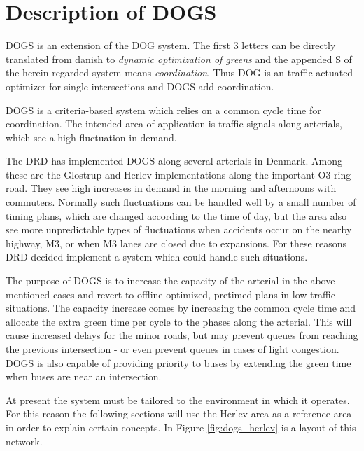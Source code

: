 \section{Description of DOGS}
\label{dogs}
DOGS is an extension of the DOG system. The first 3 letters can be directly translated from danish to \textit{dynamic optimization of greens} and the appended S of the herein regarded system means \textit{coordination}. Thus DOG is an traffic actuated optimizer for single intersections and DOGS add coordination.

DOGS is a criteria-based system which relies on a common cycle time for coordination. The intended area of application is traffic signals along arterials, which see a high fluctuation in demand. 

The DRD has implemented DOGS along several arterials in Denmark. 
Among these are the Glostrup and Herlev implementations along the important O3 ring-road. They see high increases in demand in the morning and afternoons with commuters. Normally such fluctuations can be handled well by a small number of timing plans, which are changed according to the time of day, but the area also see more unpredictable types of fluctuations when accidents occur on the nearby highway, M3, or when M3 lanes are closed due to expansions. For these reasons DRD decided implement a system which could handle such situations.

The purpose of DOGS is to increase the capacity of the arterial in the above mentioned cases and revert to offline-optimized, pretimed plans in low traffic situations. The capacity increase comes by increasing the common cycle time and allocate the extra green time per cycle to the phases along the arterial. This will cause increased delays for the minor roads, but may prevent queues from reaching the previous intersection - or even prevent queues in cases of light congestion.
DOGS is also capable of providing priority to buses by extending the green time when buses are near an intersection.

At present the system must be tailored to the environment in which it operates. For this reason the following sections will use the Herlev area as a reference area in order to explain certain concepts. In Figure \ref{fig:dogs_herlev} is a layout of this network.


